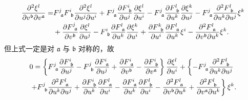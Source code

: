 \begin{align*}
    \frac{\partial^2 \xi^l}{\partial v^{\mathfrak{b}} \partial v^{\mathfrak{a}}}= & 
    F^j_{\hphantom{j}\mathfrak{a}} F^i_{\hphantom{i}\mathfrak{b}} 
    \frac{\partial^2 \xi^l}{\partial u^j \partial u^i}+F^j_{\hphantom{j}\mathfrak{a}} 
    \frac{\partial F^i_{\hphantom{i}\mathfrak{b}}}{\partial u^j} \frac{\partial \xi^l}{\partial u^i} 
    -F^j_{\hphantom{j}\mathfrak{a}} \frac{\partial F^l_{\hphantom{l}\mathfrak{b}}}{\partial u^k}
     \frac{\partial \xi^k}{\partial u^j}      -F^j_{\hphantom{j}\mathfrak{a}} 
     \frac{\partial^2 F^l_{\hphantom{l}\mathfrak{b}}}{\partial u^k \partial u^j} \xi^k \\
    & +\frac{\partial F^j_{\hphantom{j}\mathfrak{a}}}{\partial v^{\mathfrak{b}}} \frac{\partial \xi^l}{\partial u^j} 
    -F^i_{\hphantom{i}\mathfrak{b}} \frac{\partial F^l_{\hphantom{l}\mathfrak{a}}}{\partial u^k} 
    \frac{\partial \xi^k}{\partial u^i}+\frac{\partial F^k_{\hphantom{k}\mathfrak{b}}}{\partial u^i} 
    \frac{\partial F^l_{\hphantom{l}\mathfrak{a}}}{\partial u^k} \xi^i
    -\frac{\partial^2 F^l_{\hphantom{l}\mathfrak{a}}}{\partial v^{\mathfrak{b}} \partial u^k} \xi^k .
\end{align*}
但上式一定是对 $\mathfrak{a}$ 与 $\mathfrak{b}$ 对称的，故
    \begin{align}
        &0=  \left\{F^j_{\hphantom{j}\mathfrak{a}} \frac{\partial F^i_{\hphantom{i}\mathfrak{b}}}{\partial u^j}
        -F^j_{\hphantom{j}\mathfrak{b}} \frac{\partial F^i_{\hphantom{i}\mathfrak{a}}}{\partial u^j}
        +\frac{\partial F^i_{\hphantom{i}\mathfrak{a}}}{\partial v^{\mathfrak{b}}}
        -\frac{\partial F^i_{\hphantom{i}\mathfrak{b}}}{\partial v^{\mathfrak{a}}}\right\} 
        \frac{\partial \xi^l}{\partial u^i} 
        +\left\{-F^j_{\hphantom{j}\mathfrak{a}} \frac{\partial^2 F^l_{\hphantom{l}\mathfrak{b}}}
        {\partial u^k \partial u^j} \right. \notag \\
        &\left. +F^j_{\hphantom{j}\mathfrak{b}} \frac{\partial^2 F^l_{\hphantom{l}\mathfrak{a}}}
        {\partial u^k \partial u^j}+\frac{\partial   F^i_{\hphantom{i}\mathfrak{b}}}{\partial u^k} 
        \frac{\partial F^l_{\hphantom{l}\mathfrak{a}}}{\partial u^i}
        -\frac{\partial F^i_{\hphantom{i}\mathfrak{a}}}{\partial u^k} 
        \frac{\partial F^l_{\hphantom{l}\mathfrak{b}}}{\partial u^i}
        -\frac{\partial^2 F^l_{\hphantom{l}\mathfrak{a}}}{\partial v^{\mathfrak{b}} \partial u^k}
        +\frac{\partial^2 F^l_{\hphantom{l}\mathfrak{b}}}{\partial v^{\mathfrak{a}} \partial u^k}\right\} \xi^k .
        \label{chhss:eqn_tmp-xif}
    \end{align}
